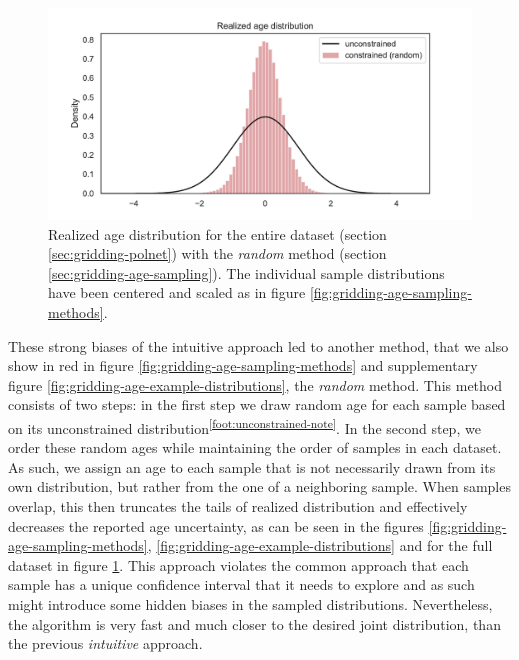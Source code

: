 \begin{refsection}
\begin{figure}
	\includegraphics[width=\linewidth]{gridding-figures/full-realized-age-distribution.pdf}
	\caption[Realized age distribution for the entire dataset]{Realized age distribution for the entire dataset (section \ref{sec:gridding-polnet}) with the \textit{random} method (section \ref{sec:gridding-age-sampling}). The individual sample distributions have been centered and scaled as in figure \ref{fig:gridding-age-sampling-methods}.}
	\label{fig:gridding-full-age-distribution}
\end{figure}

These strong biases of the intuitive approach led to another method, that we also show in red in figure \ref{fig:gridding-age-sampling-methods} and supplementary figure \ref{fig:gridding-age-example-distributions}, the \textit{random} method. This method consists of two steps: in the first step we draw random age for each sample based on its unconstrained distribution\textsuperscript{\ref{foot:unconstrained-note}}. In the second step, we order these random ages while maintaining the order of samples in each dataset. As such, we assign an age to each sample that is not necessarily drawn from its own distribution, but rather from the one of a neighboring sample. When samples overlap, this then truncates the tails of realized distribution and effectively decreases the reported age uncertainty, as can be seen in the figures \ref{fig:gridding-age-sampling-methods}, \ref{fig:gridding-age-example-distributions} and for the full dataset in figure \ref{fig:gridding-full-age-distribution}. This approach violates the common approach that each sample has a unique confidence interval that it needs to explore and as such might introduce some hidden biases in the sampled distributions. Nevertheless, the algorithm is very fast and much closer to the  desired joint distribution, than the previous \textit{intuitive} approach.



\end{refsection}
